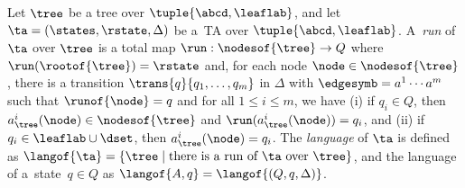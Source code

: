
Let $\tree$ be a tree over $\tuple{\abcd,\leaflab}$, and let $\ta = (\states,
\rstate, \Delta)$ be a~TA over $\tuple{\abcd,\leaflab}$.  A~\emph{run} of~$\ta$
over $\tree$ is a total map $\run: \nodesof{\tree} \to Q$ where
$\run(\rootof{\tree}) = \rstate$ and, for each node $\node \in \nodesof{\tree}$,
there is a transition $\trans{q}{q_1, \dots, q_m}$ in $\Delta$ with
$\edgesymb = a^1 \cdots a^m$ such that $\runof{\node} = q$ and for all $1
\leq i \leq m$, we have (i) if $q_i \in Q$, then $a_{\tree}^i(\node) \in
\nodesof{\tree}$ and $\run(a_{\tree}^i(\node)) = q_i$, and (ii) if $q_i \in
\leaflab \cup \dset$, then $a_{\tree}^i(\node) = q_i$. 
%
%
%
%
The \emph{language} of $\ta$ is defined as $\langof{\ta}= \{\tree
\mid \mbox{there is a run of $\ta$ over $\tree$} \}$, and the language of a~state~$q \in Q$ as $\langof{A, q} = \langof{(Q, q, \Delta)}$.


